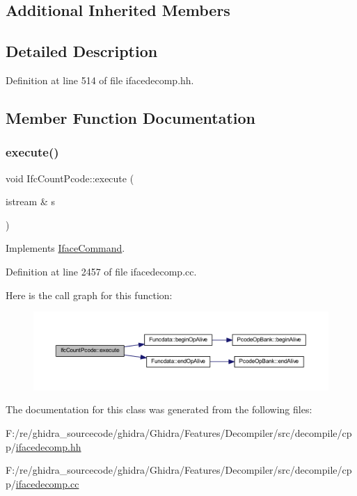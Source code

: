 \subsection*{Additional Inherited Members}


\subsection{Detailed Description}


Definition at line 514 of file ifacedecomp.\+hh.



\subsection{Member Function Documentation}
\mbox{\label{class_ifc_count_pcode_ae6be267ea3118053a6e9945faa609350}} 
\subsubsection{\texorpdfstring{execute()}{execute()}}
{\footnotesize\ttfamily void Ifc\+Count\+Pcode\+::execute (\begin{DoxyParamCaption}\item[{istream \&}]{s }\end{DoxyParamCaption})\hspace{0.3cm}{\ttfamily [virtual]}}



Implements \mbox{\hyperlink{class_iface_command_af10e29cee2c8e419de6efe9e680ad201}{Iface\+Command}}.



Definition at line 2457 of file ifacedecomp.\+cc.

Here is the call graph for this function\+:
\nopagebreak
\begin{figure}[H]
\begin{center}
\leavevmode
\includegraphics[width=350pt]{class_ifc_count_pcode_ae6be267ea3118053a6e9945faa609350_cgraph}
\end{center}
\end{figure}


The documentation for this class was generated from the following files\+:\begin{DoxyCompactItemize}
\item 
F\+:/re/ghidra\+\_\+sourcecode/ghidra/\+Ghidra/\+Features/\+Decompiler/src/decompile/cpp/\mbox{\hyperlink{ifacedecomp_8hh}{ifacedecomp.\+hh}}\item 
F\+:/re/ghidra\+\_\+sourcecode/ghidra/\+Ghidra/\+Features/\+Decompiler/src/decompile/cpp/\mbox{\hyperlink{ifacedecomp_8cc}{ifacedecomp.\+cc}}\end{DoxyCompactItemize}
